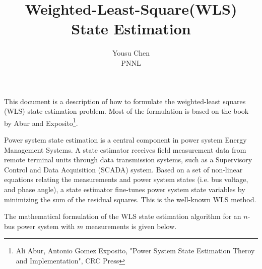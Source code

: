 \documentclass[12pt]{article}
\begin{document}
\title{Weighted-Least-Square(WLS) State Estimation}
\author{Yousu Chen \\PNNL}
\maketitle
This document is a description of how to formulate the weighted-least squares
(WLS) state estimation problem. Most of the formulation is based on the
book by Abur and Exposito\footnote{Ali Abur, Antonio Gomez Exposito, "Power
System State Estimation Theroy and Implementation", CRC Press }.

Power system state estimation is a central component in power system Energy
Management Systems. A state estimator receives field measurement data from
remote terminal units through data transmission systems, such as a Supervisory
Control and Data Acquisition (SCADA) system. Based on a set of non-linear
equations relating the measurements and power system states (i.e.  bus voltage,
and phase angle), a state estimator fine-tunes power system state variables by
minimizing the sum of the residual squares.  This is the well-known WLS method.

The mathematical formulation of the WLS state estimation algorithm for an
$n$-bus power system with $m$ measurements is given below.
\end{document}
